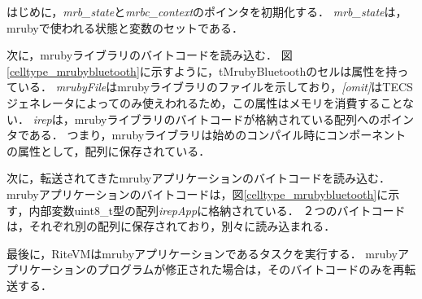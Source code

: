 \documentclass[submit]{ipsj_v2/UTF8/ipsj}
\begin{document}
はじめに，{\it mrb\_state}と{\it mrbc\_context}のポインタを初期化する．
{\it mrb\_state}は，mrubyで使われる状態と変数のセットである．

次に，mrubyライブラリのバイトコードを読み込む．
図\ref{celltype_mrubybluetooth}に示すように，tMrubyBluetoothのセルは属性を持っている．
{\it mrubyFile}はmrubyライブラリのファイルを示しており，{\it [omit]}はTECSジェネレータによってのみ使えわれるため，この属性はメモリを消費することない．
{\it irep}は，mrubyライブラリのバイトコードが格納されている配列へのポインタである．
つまり，mrubyライブラリは始めのコンパイル時にコンポーネントの属性として，配列に保存されている．

次に，転送されてきたmrubyアプリケーションのバイトコードを読み込む．
mrubyアプリケーションのバイトコードは，図\ref{celltype_mrubybluetooth}に示す，内部変数uint8\_t型の配列{\it irepApp}に格納されている．
２つのバイトコードは，それぞれ別の配列に保存されており，別々に読み込まれる．

最後に，RiteVMはmrubyアプリケーションであるタスクを実行する．
mrubyアプリケーションのプログラムが修正された場合は，そのバイトコードのみを再転送する．
\end{document}
